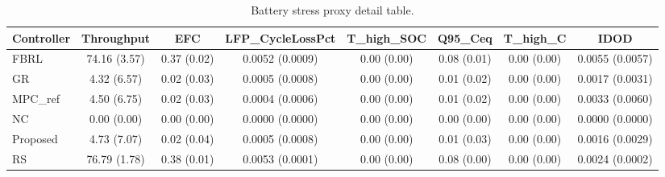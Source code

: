 \begin{table}[t]
\centering
\caption{Battery stress proxy detail table.}
\label{tab:stress_proxy_auto}
\begin{tabular}{lccccccc}
\toprule
Controller & Throughput & EFC & LFP\_CycleLossPct & T\_high\_SOC & Q95\_Ceq & T\_high\_C & IDOD \\
\midrule
FBRL & 74.16 (3.57) & 0.37 (0.02) & 0.0052 (0.0009) & 0.00 (0.00) & 0.08 (0.01) & 0.00 (0.00) & 0.0055 (0.0057) \\
GR & 4.32 (6.57) & 0.02 (0.03) & 0.0005 (0.0008) & 0.00 (0.00) & 0.01 (0.02) & 0.00 (0.00) & 0.0017 (0.0031) \\
MPC\_ref & 4.50 (6.75) & 0.02 (0.03) & 0.0004 (0.0006) & 0.00 (0.00) & 0.01 (0.02) & 0.00 (0.00) & 0.0033 (0.0060) \\
NC & 0.00 (0.00) & 0.00 (0.00) & 0.0000 (0.0000) & 0.00 (0.00) & 0.00 (0.00) & 0.00 (0.00) & 0.0000 (0.0000) \\
Proposed & 4.73 (7.07) & 0.02 (0.04) & 0.0005 (0.0008) & 0.00 (0.00) & 0.01 (0.03) & 0.00 (0.00) & 0.0016 (0.0029) \\
RS & 76.79 (1.78) & 0.38 (0.01) & 0.0053 (0.0001) & 0.00 (0.00) & 0.08 (0.00) & 0.00 (0.00) & 0.0024 (0.0002) \\
\bottomrule
\end{tabular}
\end{table}